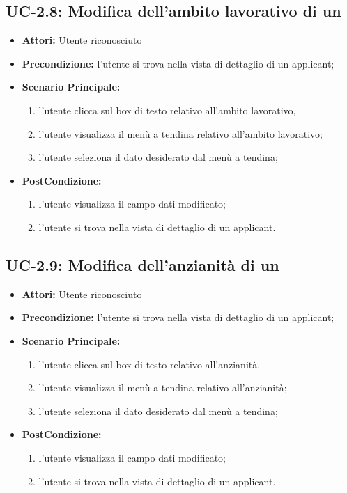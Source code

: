 \subsection{UC-2.8: Modifica dell'ambito lavorativo di un \applicant}
\begin{itemize}
	\item \textbf{Attori:} Utente riconosciuto
	\item \textbf{Precondizione:}  l'utente si trova nella vista di dettaglio di un applicant;
	\item \textbf{Scenario Principale:}
	\begin{enumerate}
		\item l'utente clicca sul box di testo relativo all'ambito lavorativo,
		\item l'utente visualizza il  menù a tendina relativo all'ambito lavorativo;
		\item l'utente seleziona il dato desiderato dal menù a tendina;
	\end{enumerate}
	\item \textbf{PostCondizione:} 
	\begin{enumerate}
		\item l'utente visualizza il campo dati modificato;
		\item l'utente si trova nella vista di dettaglio di un applicant.
	\end{enumerate}
	
\end{itemize}

\subsection{UC-2.9: Modifica dell'anzianità di un \applicant}
\begin{itemize}
	\item \textbf{Attori:} Utente riconosciuto
	\item \textbf{Precondizione:}  l'utente si trova nella vista di dettaglio di un applicant;
	\item \textbf{Scenario Principale:}
	\begin{enumerate}
		\item l'utente clicca sul box di testo relativo all'anzianità,
		\item l'utente visualizza il menù a tendina relativo all'anzianità;
		\item l'utente seleziona il dato desiderato dal menù a tendina;
	\end{enumerate}
	\item \textbf{PostCondizione:} 
	\begin{enumerate}
		\item l'utente visualizza il campo dati modificato;
		\item l'utente si trova nella vista di dettaglio di un applicant.
	\end{enumerate}
	
\end{itemize}

